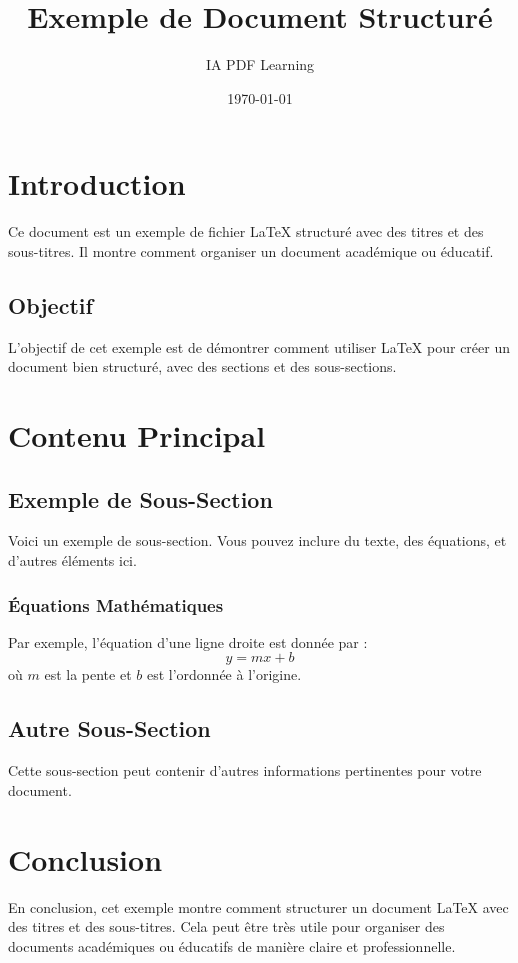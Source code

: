 \documentclass{article}
\title{Exemple de Document Structuré}
\author{IA PDF Learning}
\date{\today}
\begin{document}
\maketitle

\section{Introduction}
Ce document est un exemple de fichier LaTeX structuré avec des titres et des sous-titres. Il montre comment organiser un document académique ou éducatif.

\subsection{Objectif}
L'objectif de cet exemple est de démontrer comment utiliser LaTeX pour créer un document bien structuré, avec des sections et des sous-sections.

\section{Contenu Principal}
\subsection{Exemple de Sous-Section}
Voici un exemple de sous-section. Vous pouvez inclure du texte, des équations, et d'autres éléments ici.

\subsubsection{Équations Mathématiques}
Par exemple, l'équation d'une ligne droite est donnée par :
\[ y = mx + b \]
où \( m \) est la pente et \( b \) est l'ordonnée à l'origine.

\subsection{Autre Sous-Section}
Cette sous-section peut contenir d'autres informations pertinentes pour votre document.

\section{Conclusion}
En conclusion, cet exemple montre comment structurer un document LaTeX avec des titres et des sous-titres. Cela peut être très utile pour organiser des documents académiques ou éducatifs de manière claire et professionnelle.
\end{document}
